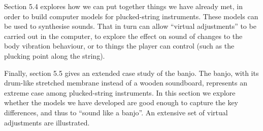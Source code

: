   Section 5.4 explores how we can put together things we have already met, in 
  order to build computer models for plucked-string instruments. These models 
  can be used to synthesise sounds. That in turn can allow ``virtual 
  adjustments'' to be carried out in the computer, to explore the effect on 
  sound of changes to the body vibration behaviour, or to things the player can 
  control (such as the plucking point along the string). 

  Finally, section 5.5 gives an extended case study of the banjo. The banjo, 
  with its drum-like stretched membrane instead of a wooden soundboard, 
  represents an extreme case among plucked-string instruments. In this section 
  we explore whether the models we have developed are good enough to capture 
  the key differences, and thus to ``sound like a banjo''. An extensive set of 
  virtual adjustments are illustrated. 

